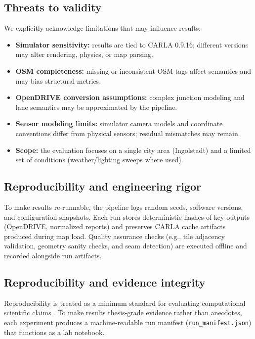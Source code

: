 \subsection{Threats to validity}
\label{sec:threats}
We explicitly acknowledge limitations that may influence results:
\begin{itemize}
    \item \textbf{Simulator sensitivity:} results are tied to CARLA 0.9.16; different versions may alter rendering, physics, or map parsing.
    \item \textbf{OSM completeness:} missing or inconsistent OSM tags affect semantics and may bias structural metrics.
    \item \textbf{OpenDRIVE conversion assumptions:} complex junction modeling and lane semantics may be approximated by the pipeline.
    \item \textbf{Sensor modeling limits:} simulator camera models and coordinate conventions differ from physical sensors; residual mismatches may remain.
    \item \textbf{Scope:} the evaluation focuses on a single city area (Ingolstadt) and a limited set of conditions (weather/lighting sweeps where used).
\end{itemize}


\subsection{Reproducibility and engineering rigor}
\label{sec:repro}
To make results re-runnable, the pipeline logs random seeds, software versions, and configuration snapshots.
Each run stores deterministic hashes of key outputs (OpenDRIVE, normalized reports) and preserves CARLA cache artifacts produced during map load.
Quality assurance checks (e.g., tile adjacency validation, geometry sanity checks, and seam detection) are executed offline and recorded alongside run artifacts.

\subsection{Reproducibility and evidence integrity}
\label{sec:repro_integrity}
Reproducibility is treated as a minimum standard for evaluating computational scientific claims \cite{peng2011reproducible,sandve2013tenrules}.
To make results thesis-grade evidence rather than anecdotes, each experiment produces a machine-readable run manifest (\texttt{run\_manifest.json}) that functions as a lab notebook.

